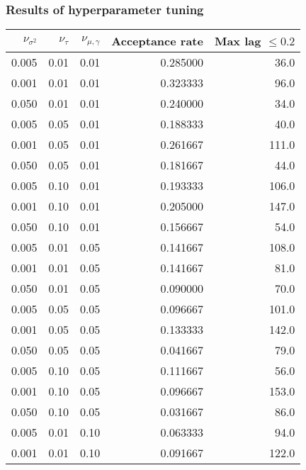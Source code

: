 \documentclass{article}
\begin{document}
\subsubsection{Results of hyperparameter tuning}
\begin{table}[H]
  \begin{center}
\begin{tabular}{rrrrr}
  $\nu_{\sigma^2}$ & $\nu_\tau$ & $\nu_{\mu, \gamma}$ & \textbf{Acceptance rate} & \textbf{Max lag $\leq 0.2$} \\
  \midrule
  0.005 &    0.01 &   0.01 &         0.285000 &           36.0 \\
  0.001 &    0.01 &   0.01 &         0.323333 &           96.0 \\
  0.050 &    0.01 &   0.01 &         0.240000 &           34.0 \\
  0.005 &    0.05 &   0.01 &         0.188333 &           40.0 \\
  0.001 &    0.05 &   0.01 &         0.261667 &          111.0 \\
  0.050 &    0.05 &   0.01 &         0.181667 &           44.0 \\
  0.005 &    0.10 &   0.01 &         0.193333 &          106.0 \\
  0.001 &    0.10 &   0.01 &         0.205000 &          147.0 \\
  0.050 &    0.10 &   0.01 &         0.156667 &           54.0 \\
  0.005 &    0.01 &   0.05 &         0.141667 &          108.0 \\
  0.001 &    0.01 &   0.05 &         0.141667 &           81.0 \\
  0.050 &    0.01 &   0.05 &         0.090000 &           70.0 \\
  0.005 &    0.05 &   0.05 &         0.096667 &          101.0 \\
  0.001 &    0.05 &   0.05 &         0.133333 &          142.0 \\
  0.050 &    0.05 &   0.05 &         0.041667 &           79.0 \\
  0.005 &    0.10 &   0.05 &         0.111667 &           56.0 \\
  0.001 &    0.10 &   0.05 &         0.096667 &          153.0 \\
  0.050 &    0.10 &   0.05 &         0.031667 &           86.0 \\
  0.005 &    0.01 &   0.10 &         0.063333 &           94.0 \\
  0.001 &    0.01 &   0.10 &         0.091667 &          122.0 \\

\end{tabular}
\end{center}
\end{table}
\end{document}
